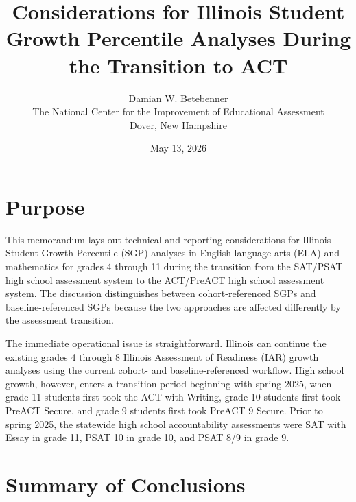 \documentclass[11pt]{article}
\begin{document}
\thispagestyle{plain}
\pagestyle{damian}

\title{\textsf{\LARGE Considerations for Illinois Student Growth Percentile Analyses During the Transition to ACT}}
\author{\Large Damian W. Betebenner\\The National Center for the Improvement of Educational Assessment\\Dover, New Hampshire}
\date{May 13, 2026}

\maketitle

\section{Purpose}

This memorandum lays out technical and reporting considerations for Illinois Student Growth Percentile (SGP) analyses in English language arts (ELA) and mathematics for grades 4 through 11 during the transition from the SAT/PSAT high school assessment system to the ACT/PreACT high school assessment system. The discussion distinguishes between cohort-referenced SGPs and baseline-referenced SGPs because the two approaches are affected differently by the assessment transition.

The immediate operational issue is straightforward. Illinois can continue the existing grades 4 through 8 Illinois Assessment of Readiness (IAR) growth analyses using the current cohort- and baseline-referenced workflow. High school growth, however, enters a transition period beginning with spring 2025, when grade 11 students first took the ACT with Writing, grade 10 students first took PreACT Secure, and grade 9 students first took PreACT 9 Secure. Prior to spring 2025, the statewide high school accountability assessments were SAT with Essay in grade 11, PSAT 10 in grade 10, and PSAT 8/9 in grade 9.

\section{Summary of Conclusions}
\end{document}
